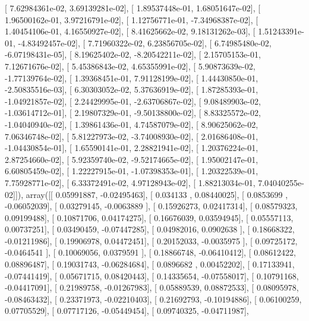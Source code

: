 \documentclass{article}
\begin{document}
       [  7.62984361e-02,   3.69139281e-02],
       [  1.89537448e-01,   1.68051647e-02],
       [  1.96500162e-01,   3.97216791e-02],
       [  1.12756771e-01,  -7.34968387e-02],
       [  1.40454106e-01,   4.16550927e-02],
       [  8.41625662e-02,   9.18131262e-03],
       [  1.51243391e-01,  -4.83492457e-02],
       [  7.71960322e-02,   6.23856705e-02],
       [  6.74985480e-02,  -6.07198431e-05],
       [  8.19625402e-02,  -8.20542211e-02],
       [  2.15705153e-01,   7.12671676e-02],
       [  5.45386843e-02,   4.65355991e-02],
       [  5.90873639e-02,  -1.77139764e-02],
       [  1.39368451e-01,   7.91128199e-02],
       [  1.44430850e-01,  -2.50835516e-03],
       [  6.30303052e-02,   5.37636919e-02],
       [  1.87285393e-01,  -1.04921857e-02],
       [  2.24429995e-01,  -2.63706867e-02],
       [  9.08489903e-02,  -1.03614712e-01],
       [  2.19807329e-01,  -9.50138800e-02],
       [  8.83325572e-02,  -1.04040940e-02],
       [  1.39861436e-01,   4.74587079e-02],
       [  8.90625062e-02,   7.06346748e-02],
       [  5.81227973e-02,  -3.74008930e-02],
       [  2.01686408e-01,  -1.04430854e-01],
       [  1.65590141e-01,   2.28821941e-02],
       [  1.20376224e-01,   2.87254660e-02],
       [  5.92359740e-02,  -9.52174665e-02],
       [  1.95002147e-01,   6.60805459e-02],
       [  1.22227915e-01,  -1.07398353e-01],
       [  1.20322539e-01,   7.75928771e-02],
       [  6.33372491e-02,   4.97128943e-02],
       [  1.88213034e-01,   7.04040255e-02]]), array([[ 0.05991887, -0.02495463],
       [ 0.034133  ,  0.08440025],
       [ 0.0853699 , -0.06052039],
       [ 0.03279145, -0.0063889 ],
       [ 0.15926273,  0.02417314],
       [ 0.08579323,  0.09199488],
       [ 0.10871706,  0.04174275],
       [ 0.16676039,  0.03594945],
       [ 0.05557113,  0.00737251],
       [ 0.03490459, -0.07447285],
       [ 0.04982016,  0.0902638 ],
       [ 0.18668322, -0.01211986],
       [ 0.19906978,  0.04472451],
       [ 0.20152033, -0.0035975 ],
       [ 0.09725172, -0.0464541 ],
       [ 0.10069056,  0.0379591 ],
       [ 0.18866748, -0.06410412],
       [ 0.08612422,  0.08896487],
       [ 0.19031743, -0.06284684],
       [ 0.0896682 ,  0.00452202],
       [ 0.17133941, -0.07441419],
       [ 0.05671715,  0.08420443],
       [ 0.14335654, -0.07558017],
       [ 0.10791168, -0.04417091],
       [ 0.21989758, -0.01267983],
       [ 0.05889539,  0.08872533],
       [ 0.08095978, -0.08463432],
       [ 0.23371973, -0.02210403],
       [ 0.21692793, -0.10194886],
       [ 0.06100259,  0.07705529],
       [ 0.07717126, -0.05449454],
       [ 0.09740325, -0.04711987],
\end{document}
